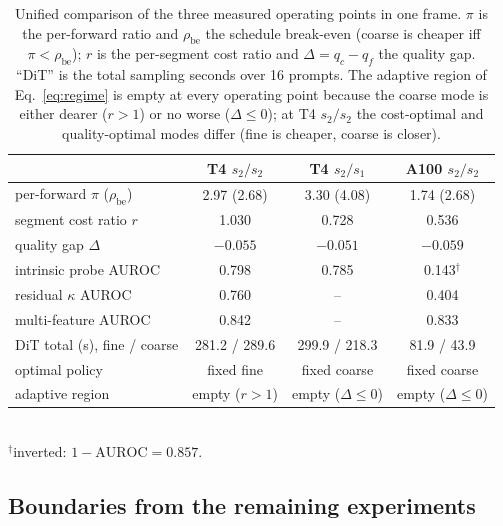 \documentclass[review]{cas-sc}          %
\begin{document}
\begin{table}
  \centering
  \caption{Unified comparison of the three measured operating points in one frame. $\pi$ is the
  per-forward ratio and $\rho_{\text{be}}$ the schedule break-even (coarse is cheaper iff
  $\pi < \rho_{\text{be}}$); $r$ is the per-segment cost ratio and $\Delta = q_c - q_f$ the quality gap.
  ``DiT'' is the total sampling seconds over 16 prompts. The adaptive region of Eq.~\eqref{eq:regime} is
  empty at every operating point because the coarse mode is either dearer ($r>1$) or no worse
  ($\Delta\le0$); at T4 $s_2/s_2$ the cost-optimal and quality-optimal modes differ (fine is cheaper,
  coarse is closer).}
  \label{tab:summary}
  \footnotesize
  \setlength{\tabcolsep}{3pt}
  \begin{tabular}{lccc}
    \toprule
     & T4 $s_2/s_2$ & T4 $s_2/s_1$ & A100 $s_2/s_2$ \\
    \midrule
    per-forward $\pi$ ($\rho_{\text{be}}$)   & 2.97 (2.68) & 3.30 (4.08) & 1.74 (2.68) \\
    segment cost ratio $r$                   & 1.030 & 0.728 & 0.536 \\
    quality gap $\Delta$                     & $-0.055$ & $-0.051$ & $-0.059$ \\
    intrinsic probe AUROC                    & 0.798 & 0.785 & 0.143$^{\dagger}$ \\
    residual $\kappa$ AUROC                  & 0.760 & -- & 0.404 \\
    multi-feature AUROC                      & 0.842 & -- & 0.833 \\
    DiT total (s), fine / coarse             & 281.2 / 289.6 & 299.9 / 218.3 & 81.9 / 43.9 \\
    optimal policy                           & fixed fine & fixed coarse & fixed coarse \\
    adaptive region                          & empty ($r>1$) & empty ($\Delta\le0$) & empty ($\Delta\le0$) \\
    \bottomrule
  \end{tabular}
  \\[2pt]
  \footnotesize $^{\dagger}$inverted: $1-\mathrm{AUROC} = 0.857$.
\end{table}

\subsection{Boundaries from the remaining experiments}
\label{sec:boundaries-extra}
\end{document}

